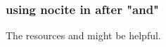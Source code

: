 \documentclass{beamer}
\begin{document}
\begin{frame}
    \frametitle{using nocite in \cite{a938381} after "and"}
    The resources \citep{a1678144} and \nocite{a938381} might be helpful.
\end{frame}


\end{document}
